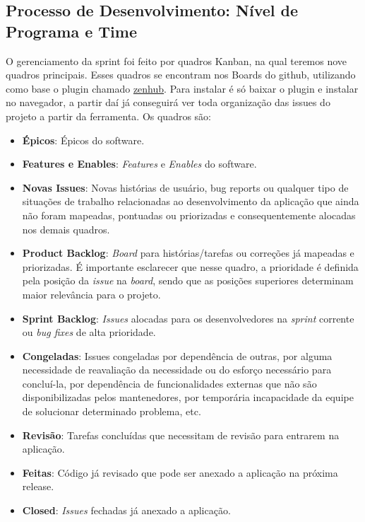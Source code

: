\subsection{Processo de Desenvolvimento: Nível de Programa e Time}

O gerenciamento da sprint foi feito por quadros Kanban, na qual teremos nove quadros principais. Esses quadros se encontram nos Boards do github, utilizando como base o plugin chamado \href{https://www.zenhub.com/}{zenhub}. Para instalar é só baixar o plugin e instalar no navegador, a partir daí já conseguirá ver toda organização das issues do projeto a partir da ferramenta. Os quadros são:

\begin{itemize}
  \item \textbf{Épicos}: Épicos do software.
  \item \textbf{Features e Enables}: \textit{Features} e \textit{Enables} do software.
  \item \textbf{Novas Issues}: Novas histórias de usuário, bug reports ou qualquer tipo de situações de trabalho relacionadas ao desenvolvimento da aplicação que ainda não foram mapeadas, pontuadas ou priorizadas e consequentemente alocadas nos demais quadros.
  \item \textbf{Product Backlog}: \textit{Board} para histórias/tarefas ou correções já mapeadas e priorizadas. É importante esclarecer que nesse quadro, a prioridade é definida pela posição da \textit{issue} na \textit{board}, sendo que as posições superiores determinam maior relevância para o projeto.
  \item \textbf{Sprint Backlog}: \textit{Issues} alocadas para os desenvolvedores na \textit{sprint} corrente ou \textit{bug fixes} de alta prioridade.
  \item \textbf{Congeladas}: Issues congeladas por dependência de outras, por alguma necessidade de reavaliação da necessidade ou do esforço necessário para concluí-la, por dependência de funcionalidades externas que não são disponibilizadas pelos mantenedores, por temporária incapacidade da equipe de solucionar determinado problema, etc.
  \item \textbf{Revisão}: Tarefas concluídas que necessitam de revisão para entrarem na aplicação.
  \item \textbf{Feitas}: Código já revisado que pode ser anexado a aplicação na próxima release.
  \item \textbf{Closed}: \textit{Issues} fechadas já anexado a aplicação.
\end{itemize}

